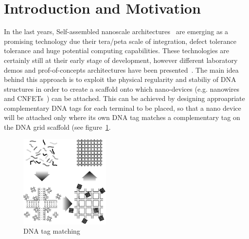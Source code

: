 
\section{Introduction and Motivation}


In the last years, Self-assembled nanoscale architectures~\cite{winfree1998, yan2003}
are emerging as a promising technology due their tera/peta scale of
integration, defect tolerance tolerance and huge potential computing
capabilities. These technologies are certainly still at
their early stage of development, however different laboratory demos and
prof-of-concepts architectures have been presented~\cite{patwardhan2004, patwardhan2006, patwardhan2006_1, pistol2009}.
The main idea behind this approach is to exploit the physical regularity and
stabiliy of DNA structures in order to create a scaffold onto which
nano-devices (e.g. nanowires and CNFETs~\cite{bachtold2001, tans1998, cui2001}) can be
attached. This can be achieved by designing approapriate complementary DNA tags for
each terminal to be placed, so that a nano device will be attached
only where its own DNA tag matches a complementary tag on the DNA grid
scaffold (see figure~\ref{fig:dna_tag}.

\begin{figure}
  \centering
    \includegraphics[width=0.40\textwidth]{pictures/dna2b.eps}
  \caption{DNA tag matching}
  \label{fig:dna_tag}
\end{figure}

